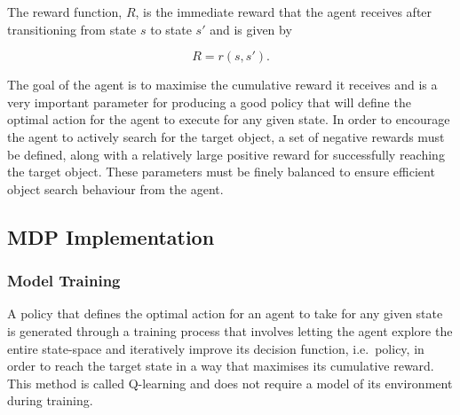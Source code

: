 \documentclass[a4paper, twoside]{article}
\begin{document}
\noindent The reward function, $R$, is the immediate reward that the agent receives after transitioning from state $s$ to state $s'$ and is given by 

\begin{equation}
  R = r(s, s').
\end{equation} 

The goal of the agent is to maximise the cumulative reward it receives and is a very important parameter for producing a good policy that will define the optimal action for the agent to execute for any given state. In order to encourage the agent to actively search for the target object, a set of negative rewards must be defined, along with a relatively large positive reward for successfully reaching the target object. These parameters must be finely balanced to ensure efficient object search behaviour from the agent.




\subsection{MDP Implementation}

\subsubsection{Model Training}

\noindent A policy that defines the optimal action for an agent to take for any given state is generated through a training process that involves letting the agent explore the entire state-space and iteratively improve its decision function, i.e.\ policy, in order to reach the target state in a way that maximises its cumulative reward. This method is called Q-learning and does not require a model of its environment during training. 
\end{document}

